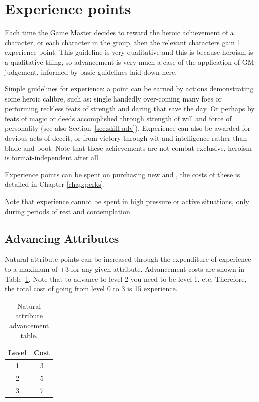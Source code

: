 \documentclass[a4paper,10pt,oneside]{book}
\newcommand{\textlf}[1]{\textbf{\titlecap{#1}}}
\begin{document}
\section{Experience points}
Each time the Game Master decides to reward the heroic achievement of a character, or each character in the group, then the relevant characters gain 1 experience point. 
This guideline is very qualitative and this is because heroism is a qualitative thing, so advancement is very much a case of the application of GM judgement, informed by basic guidelines laid down here.

Simple guidelines for experience: a point can be earned by actions demonstrating some heroic calibre, such as: single handedly over-coming many foes or performing reckless feats of strength and daring that save the day. Or perhaps by feats of magic or deeds accomplished through strength of will and force of personality (see also Section~\ref{sec:skill-adv}). Experience can also be awarded for devious acts of deceit, or from victory through wit and intelligence rather than blade and boot. Note that these achievements are not combat exclusive, heroism is format-independent after all.

Experience points can be spent on purchasing new \textlf{perks} and \textlf{proficiencies}, the costs of these is detailed in Chapter \ref{chap:perks}. 


Note that experience cannot be spent in high pressure or active situations, only during periods of rest and contemplation.

\subsection{Advancing Attributes}
Natural attribute points can  be increased through the expenditure of experience to a maximum of +3 for any given attribute. Advancement costs are shown in Table~\ref{tab:nat-att}. Note that to advance to level 2 you need to be level 1, etc. Therefore, the total cost of going from level 0 to 3 is 15 experience. 
\begin{table}[ht!]
	\centering
	\begin{tabular}{|c|c|}
		\hline
		Level & Cost \\
		\hline
		1 & 3 \\
		2 & 5 \\
		3 & 7 \\
		\hline
	\end{tabular}
	\caption{Natural attribute advancement table.}
	\label{tab:nat-att}
\end{table}  
\end{document}
